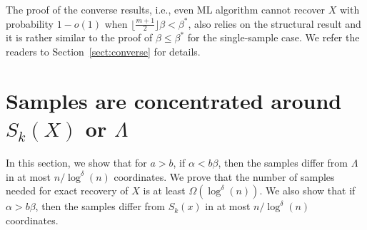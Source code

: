\documentclass{article}
\begin{document}
The proof of the converse results, i.e., even ML algorithm cannot recover $X$ with probability $1-o(1)$ when $\lfloor \frac{m+1}{2} \rfloor \beta < \beta^\ast$, also relies on the structural result and it is rather similar to the proof of $\beta\le\beta^\ast$ for the single-sample case. We refer the readers to Section~\ref{sect:converse} for details.

\section{Samples are concentrated around $S_k(X)$ or $\Lambda$} \label{sect:aln}
In this section, we show that for $a>b$, if $\alpha<b\beta$, then the samples differ from  $\Lambda$ in at most $n/\log^{\delta}(n)$ coordinates.
We prove that the number of samples needed for exact recovery of $X$ is at least $\Omega(\log^{\delta}(n))$. We also show that if $\alpha > b\beta$, then the samples differ from  $S_k(x)$ in at most $n/\log^{\delta}(n)$ coordinates.
\end{document}
